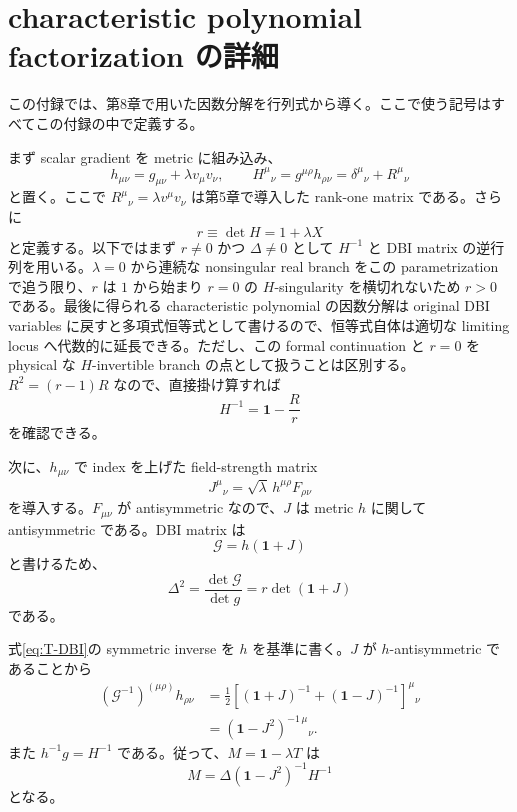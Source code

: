 \documentclass[a4paper,11pt]{ltjsreport}
\newcommand{\G}{\mathcal G}
\newcommand{\Id}{\mathbf 1}
\begin{document}
\chapter{characteristic polynomial factorization の詳細}
\label{app:charfactor}

この付録では、第8章で用いた因数分解を行列式から導く。ここで使う記号はすべてこの付録の中で定義する。

まず scalar gradient を metric に組み込み、
\begin{equation}
 h_{\mu\nu}=g_{\mu\nu}+\lambda v_\mu v_\nu,
 \qquad
 H^\mu{}_{\nu}=g^{\mu\rho}h_{\rho\nu}=\delta^\mu{}_{\nu}+R^\mu{}_{\nu}
 \label{eq:app-h-H}
\end{equation}
と置く。ここで $R^\mu{}_{\nu}=\lambda v^\mu v_\nu$ は第5章で導入した rank-one matrix である。さらに
\begin{equation}
 r\equiv\det H=1+\lambda X
 \label{eq:app-r}
\end{equation}
と定義する。以下ではまず $r\neq0$ かつ $\Delta\neq0$ として $H^{-1}$ と DBI matrix の逆行列を用いる。$\lambda=0$ から連続な nonsingular real branch をこの parametrization で追う限り、$r$ は $1$ から始まり $r=0$ の $H$-singularity を横切れないため $r>0$ である。最後に得られる characteristic polynomial の因数分解は original DBI variables に戻すと多項式恒等式として書けるので、恒等式自体は適切な limiting locus へ代数的に延長できる。ただし、この formal continuation と $r=0$ を physical な $H$-invertible branch の点として扱うことは区別する。$R^2=(r-1)R$ なので、直接掛け算すれば
\begin{equation}
 H^{-1}=\Id-\frac{R}{r}
 \label{eq:app-Hinv}
\end{equation}
を確認できる。

次に、$h_{\mu\nu}$ で index を上げた field-strength matrix
\begin{equation}
 J^\mu{}_{\nu}=\sqrt\lambda\,h^{\mu\rho}F_{\rho\nu}
 \label{eq:app-J}
\end{equation}
を導入する。$F_{\mu\nu}$ が antisymmetric なので、$J$ は metric $h$ に関して antisymmetric である。DBI matrix は
\begin{equation}
 \G=h(\Id+J)
\end{equation}
と書けるため、
\begin{equation}
 \Delta^2
 =\frac{\det\G}{\det g}
 =r\det(\Id+J)
 \label{eq:app-Delta-J}
\end{equation}
である。

式\eqref{eq:T-DBI}の symmetric inverse を $h$ を基準に書く。$J$ が $h$-antisymmetric であることから
\begin{align}
 (\G^{-1})^{(\mu\rho)}h_{\rho\nu}
 &=\frac12\left[(\Id+J)^{-1}+(\Id-J)^{-1}\right]^\mu{}_{\nu}\nonumber\\
 &=(\Id-J^2)^{-1\,\mu}{}_{\nu}.
 \label{eq:app-sym-inverse}
\end{align}
また $h^{-1}g=H^{-1}$ である。従って、$M=\Id-\lambda T$ は
\begin{equation}
 M=\Delta(\Id-J^2)^{-1}H^{-1}
 \label{eq:app-M-effective}
\end{equation}
となる。
\end{document}

